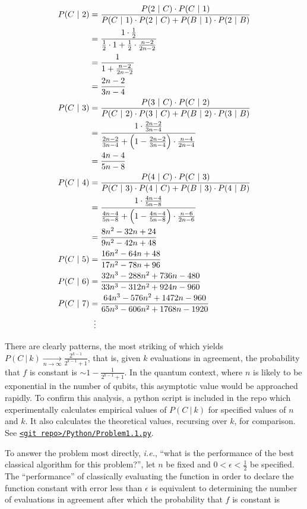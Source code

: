 \begin{align*}
P(C\ |\  2)&=\frac{P(2\ |\ C)\cdot P(C\ |\ 1)}{ P(C\ |\ 1) \cdot P(2\ |\ C) +  P(B\ |\ 1) \cdot P(2\ |\ B)} \\
&=\frac{1\cdot\frac12}{\frac12\cdot1+\frac12\cdot\frac{n-2}{2n-2}} \\
&=\frac{1}{1+\frac{n-2}{2n-2}} \\
&=\frac{2n-2}{3n-4} \\
P(C\ |\ 3)&=\frac{P(3\ |\ C)\cdot P(C\ |\ 2)}{ P(C\ |\ 2) \cdot P(3\ |\ C) +  P(B\ |\ 2) \cdot P(3\ |\ B)} \\
&=\frac{1\cdot\frac{2n-2}{3n-4}}{\frac{2n-2}{3n-4}+\left(1-\frac{2n-2}{3n-4}\right)\cdot\frac{n-4}{2n-4}} \\
&=\frac{4n-4}{5n-8} \\
P(C\ |\ 4)&=\frac{P(4\ |\ C)\cdot P(C\ |\ 3)}{ P(C\ |\ 3) \cdot P(4\ |\ C) +  P(B\ |\ 3) \cdot P(4\ |\ B)} \\
&=\frac{1\cdot\frac{4n-4}{5n-8}}{\frac{4n-4}{5n-8}+\left(1-\frac{4n-4}{5n-8}\right)\cdot\frac{n-6}{2n-6}} \\
&=\frac{8n^2-32n+24}{9n^2-42n+48} \\
P(C\ |\ 5)&=\frac{16n^2-64n+48}{17n^2-78n+96} \\
P(C\ |\ 6)&=\frac{32n^3-288n^2+736n-480}{33n^3-312n^2+924n-960} \\
P(C\ |\ 7)&=\frac{64n^3-576n^2+1472n-960}{65n^3-606n^2+1768n-1920} \\
&\mathrel{\makebox[\widthof{=}]{\vdots}}
\end{align*}

There are clearly patterns, the most striking of which yields $P(C\ |\ k) \xrightarrow[n\to\infty]{}\frac{2^{k-1}}{2^{k-1}+1}$, that is, given $k$ evaluations in agreement, the probability that $f$ is constant is $\sim1-\frac{1}{2^{k-1}+1}$.  In the quantum context, where $n$ is likely to be exponential in the number of qubits, this asymptotic value would be approached rapidly.  To confirm this analysis, a python script is included in the repo which experimentally calculates empirical values of $P(C\ |\ k)$ for specified values of $n$ and $k$.  It also calculates the theoretical values, recursing over $k$, for comparison.  See \href{https://github.com/tlesaul2/SolutionQCQINielsenChuang/blob/master/Python/Problem1.1.py}{\texttt{<git repo>/Python/Problem1.1.py}}.

To answer the problem most directly, \textit{i.e.}, ``what is the performance of the best classical algorithm for this problem?'', let $n$ be fixed and $0<\epsilon<\frac{1}{2}$ be specified.  The ``performance'' of classically evaluating the function in order to declare the function constant with error less than $\epsilon$  is equivalent to determining the number of evaluations in agreement after which the probability that $f$ is constant is  

